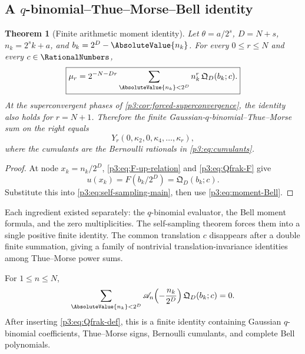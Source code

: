 \documentclass[11pt,oneside]{article}
\numberwithin{equation}{section}
\newtheorem{theorem}{Theorem}[section]
\theoremstyle{definition}
\theoremstyle{remark}
\begin{document}
\subsection{A $q$-binomial--Thue--Morse--Bell identity}

\begin{theorem}[Finite arithmetic moment identity]
\label{p3:thm:qbinomial-moment-identity}
Let $\theta=a/2^s$, $D=N+s$, $n_k=2^sk+a$, and $b_k=2^D-\AbsoluteValue{n_k}$.  For every $0\le r\le N$ and every $c\in\RationalNumbers$,
\begin{equation}
 \boxed{\displaystyle
 \mu_r
 =2^{-N-Dr}
 \sum_{\AbsoluteValue{n_k}<2^D}
 n_k^r\,\mathfrak Q_D(b_k;c).}
 \label{p3:eq:qbinomial-moment-identity}
\end{equation}
At the superconvergent phases of \cref{p3:cor:forced-superconvergence}, the identity also holds for $r=N+1$.  Therefore the finite Gaussian-$q$-binomial--Thue--Morse sum on the right equals
\begin{equation}
 Y_r(0,\kappa_2,0,\kappa_4,\ldots,\kappa_r),
 \label{p3:eq:qbinomial-Bell-right}
\end{equation}
where the cumulants are the Bernoulli rationals in \eqref{p3:eq:cumulants}.
\end{theorem}

\begin{proof}
At node $x_k=n_k/2^D$, \eqref{p3:eq:F-up-relation} and \eqref{p3:eq:Qfrak-F} give
\[
 u(x_k)=F(b_k/2^D)=\mathfrak Q_D(b_k;c).
\]
Substitute this into \eqref{p3:eq:self-sampling-main}, then use \eqref{p3:eq:moment-Bell}.
\end{proof}

\begin{remark}
Each ingredient existed separately: the $q$-binomial evaluator, the Bell moment formula, and the zero multiplicities.  The self-sampling theorem forces them into a single positive finite identity.  The common translation $c$ disappears after a double finite summation, giving a family of nontrivial translation-invariance identities among Thue--Morse power sums.
\end{remark}

\begin{corollary}
\label{p3:cor:q-Appell-cancellation}
For $1\le n\le N$,
\begin{equation}
 \sum_{\AbsoluteValue{n_k}<2^D}
 \Acal_n\!\left(-\frac{n_k}{2^D}\right)
 \mathfrak Q_D(b_k;c)=0.
 \label{p3:eq:q-Appell-cancellation}
\end{equation}
After inserting \eqref{p3:eq:Qfrak-def}, this is a finite identity containing Gaussian $q$-binomial coefficients, Thue--Morse signs, Bernoulli cumulants, and complete Bell polynomials.
\end{corollary}
\end{document}
